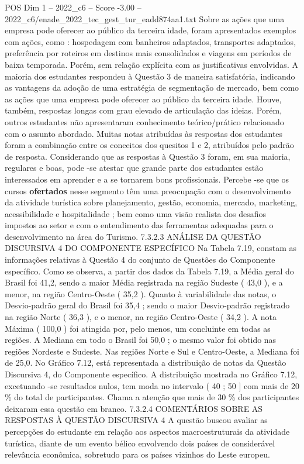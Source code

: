 \begin{textsample}{POS Dim 1 – 2022\_c6 – Score -3.00 – 2022\_c6/enade\_2022\_tec\_gest\_tur\_eadd874aa1.txt}
Sobre as ações que uma empresa pode oferecer ao público da terceira idade, foram apresentados exemplos com ações, como : hospedagem com banheiros adaptados, transportes adaptados, preferência por roteiros em destinos mais consolidados e viagens em períodos de baixa temporada.
Porém, sem relação explícita com as justificativas envolvidas.
A maioria dos estudantes respondeu à Questão 3 de maneira satisfatória, indicando as vantagens da adoção de uma estratégia de segmentação de mercado, bem como as ações que uma empresa pode oferecer ao público da terceira idade.
Houve, também, respostas longas com grau elevado de articulação das ideias.
Porém, outros estudantes não apresentaram conhecimento teórico/prático relacionado com o assunto abordado.
Muitas notas atribuídas às respostas dos estudantes foram a combinação entre os conceitos dos quesitos 1 e 2, atribuídos pelo padrão de resposta.
Considerando que as respostas à Questão 3 foram, em sua maioria, regulares e boas, pode -se atestar que grande parte dos estudantes estão interessados em aprender e a se tornarem bons profissionais.
Percebe -se que os cursos \textbf{ofertados} nesse segmento têm uma preocupação com o desenvolvimento da atividade turística sobre planejamento, gestão, economia, mercado, marketing, acessibilidade e hospitalidade ; bem como uma visão realista dos desafios impostos ao setor e com o entendimento das ferramentas adequadas para o desenvolvimento na área do Turismo. 7.3.2.3 ANÁLISE DA QUESTÃO DISCURSIVA 4 DO COMPONENTE ESPECÍFICO Na Tabela 7.19, constam as informações relativas à Questão 4 do conjunto de Questões do Componente específico.
Como se observa, a partir dos dados da Tabela 7.19, a Média geral do Brasil foi 41,2, sendo a maior Média registrada na região Sudeste ( 43,0 ), e a menor, na região Centro-Oeste ( 35,2 ).
Quanto à variabilidade das notas, o Desvio-padrão geral do Brasil foi 35,4 ; sendo o maior Desvio-padrão registrado na região Norte ( 36,3 ), e o menor, na região Centro-Oeste ( 34,2 ).
A nota Máxima ( 100,0 ) foi atingida por, pelo menos, um concluinte em todas as regiões.
A Mediana em todo o Brasil foi 50,0 ; o mesmo valor foi obtido nas regiões Nordeste e Sudeste.
Nas regiões Norte e Sul e Centro-Oeste, a Mediana foi de 25,0.
No Gráfico 7.12, está representada a distribuição de notas da Questão Discursiva 4, do Componente específico.
A distribuição mostrada no Gráfico 7.12, excetuando -se resultados nulos, tem moda no intervalo ( 40 ; 50 ] com mais de 20 \% do total de participantes.
Chama a atenção que mais de 30 \% dos participantes deixaram essa questão em branco. 7.3.2.4 COMENTÁRIOS SOBRE AS RESPOSTAS À QUESTÃO DISCURSIVA 4 A questão buscou avaliar as percepções do estudante em relação aos aspectos macroestruturais da atividade turística, diante de um evento bélico envolvendo dois países de considerável relevância econômica, sobretudo para os países vizinhos do Leste europeu.

\end{textsample}
